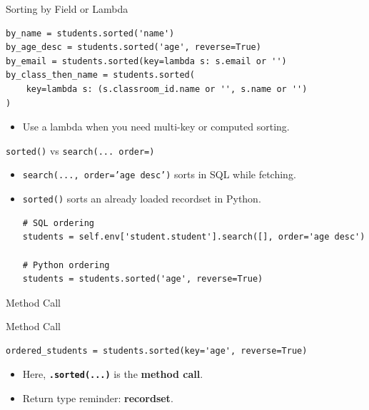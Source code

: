 \begin{frame}[fragile]{Sorting by Field or Lambda}
\begin{lstlisting}
by_name = students.sorted('name')
by_age_desc = students.sorted('age', reverse=True)
by_email = students.sorted(key=lambda s: s.email or '')
by_class_then_name = students.sorted(
	key=lambda s: (s.classroom_id.name or '', s.name or '')
)
\end{lstlisting}
	\begin{itemize}
		\item Use a lambda when you need multi-key or computed sorting.
	\end{itemize}
\end{frame}

\begin{frame}[fragile]{\texttt{sorted()} vs \texttt{search(... order=)}}
	\begin{itemize}
		\item \texttt{search(..., order='age desc')} sorts in SQL while fetching.
		\item \texttt{sorted()} sorts an already loaded recordset in Python.
\begin{lstlisting}
# SQL ordering
students = self.env['student.student'].search([], order='age desc')

# Python ordering
students = students.sorted('age', reverse=True)
\end{lstlisting}
	\end{itemize}
\end{frame}

\begin{frame}[fragile]{Method Call}
\begin{block}{Method Call}
\begin{lstlisting}
ordered_students = students.sorted(key='age', reverse=True)
\end{lstlisting}
	\begin{itemize}
		\item Here, \textbf{\texttt{.sorted(...)}} is the \textbf{method call}.
		\item Return type reminder: \textbf{recordset}.
	\end{itemize}
\end{block}
\end{frame}
